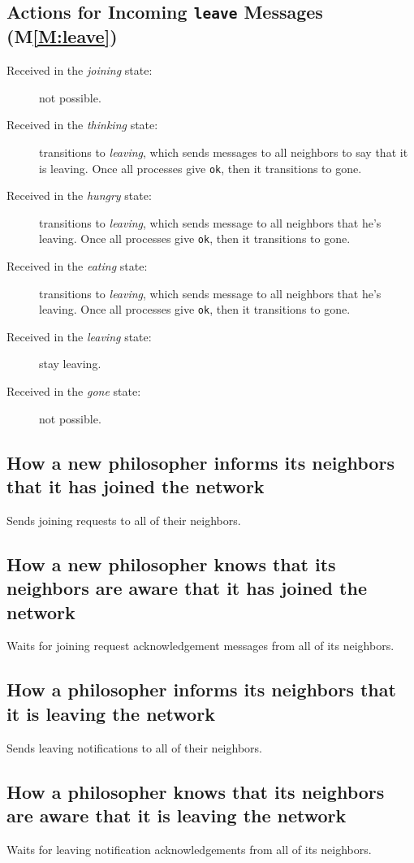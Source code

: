 \documentclass[11pt]{article}
\begin{document}
\subsection{Actions for Incoming \texttt{leave} Messages (M\ref{M:leave})}
\begin{description}
\item[Received in the \textit{joining} state:] not possible.
\item[Received in the \textit{thinking} state:] transitions to \emph{leaving}, which sends messages to all neighbors to say that it is leaving. Once all processes give \texttt{ok}, then it transitions to gone.
\item[Received in the \textit{hungry} state:] transitions to \emph{leaving}, which sends message to all neighbors that he's leaving. Once all processes give \texttt{ok}, then it transitions to gone.
\item[Received in the \textit{eating} state:] transitions to \emph{leaving}, which sends message to all neighbors that he's leaving. Once all processes give \texttt{ok}, then it transitions to gone.
\item[Received in the \textit{leaving} state:] stay leaving.
\item[Received in the \textit{gone} state:] not possible.
\end{description}


\subsection{How a new philosopher informs its neighbors that it has joined the network}
Sends joining requests to all of their neighbors.

\subsection{How a new philosopher knows that its neighbors are aware that it has joined the network}
Waits for joining request acknowledgement messages from all of its neighbors.
\subsection{How a philosopher informs its neighbors that it is leaving the network}
Sends leaving notifications to all of their neighbors.

\subsection{How a philosopher knows that its neighbors are aware that it is leaving the network}
Waits for leaving notification acknowledgements from all of its neighbors.
\end{document}
